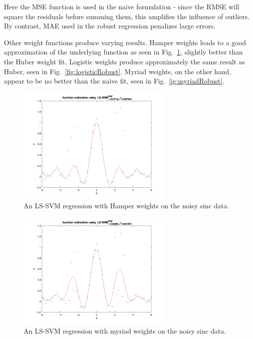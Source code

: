 \documentclass[10pt,a4paper]{article}
\begin{document}
Here the MSE function is used in the naive formulation - since the RMSE will square the residuals before summing them, this amplifies the influence of outliers. By contrast, MAE used in the robust regression penalizes large errors.

Other weight functions produce varying results. Hamper weights leads to a good approximation of the underlying function as seen in Fig.~\ref{fig:hamperRobust}, slightly better than the Huber weight fit. Logistic weights produce approximately the same result as Huber, seen in Fig.~\ref{fig:logisticRobust}. Myriad weights, on the other hand, appear to be no better than the naive fit, seen in Fig.~\ref{ig:myriadRobust}.

\begin{figure}[h!]
  \includegraphics[width=3in]{robustHamper.png}
  \caption{An LS-SVM regression with Hamper weights on the noisy sinc data.}
  \label{fig:hamperRobust}
\end{figure}

\begin{figure}[h!]
  \includegraphics[width=3in]{robustMyriad.png}
  \caption{An LS-SVM regression with myriad weights on the noisy sinc data.}
  \label{fig:myriadRobust}
\end{figure}
\end{document}
